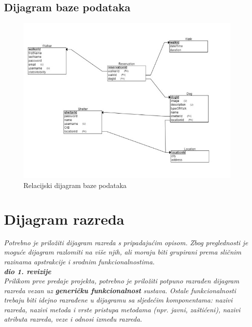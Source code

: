 			
			\subsection{Dijagram baze podataka}
				
				\vspace{15pt} 
				\begin{figure}[H]
					\includegraphics[scale=0.9]{dijagrami/relacijski.jpeg} %
					\centering
					\caption{Relacijski dijagram baze podataka}
					\label{fig:relacijski}
				\end{figure}
				\vspace{15pt}
			
			\eject
			
			
		\section{Dijagram razreda}
		
		\iffalse
			\textit{Potrebno je priložiti dijagram razreda s pripadajućim opisom. Zbog preglednosti je moguće dijagram razlomiti na više njih, ali moraju biti grupirani prema sličnim razinama apstrakcije i srodnim funkcionalnostima.}\\
			
			\textbf{\textit{dio 1. revizije}}\\
			
			\textit{Prilikom prve predaje projekta, potrebno je priložiti potpuno razrađen dijagram razreda vezan uz \textbf{generičku funkcionalnost} sustava. Ostale funkcionalnosti trebaju biti idejno razrađene u dijagramu sa sljedećim komponentama: nazivi razreda, nazivi metoda i vrste pristupa metodama (npr. javni, zaštićeni), nazivi atributa razreda, veze i odnosi između razreda.}\\
			
